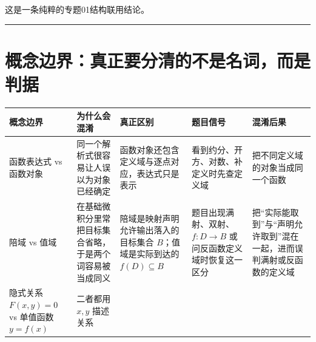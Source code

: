 \documentclass[11pt,a4paper]{ctexart}
\newcounter{none}
\begin{document}
这是一条纯粹的专题01结构联用结论。

\begin{center}\rule{0.5\linewidth}{0.5pt}\end{center}

\section{概念边界：真正要分清的不是名词，而是判据}\label{ux6982ux5ff5ux8fb9ux754cux771fux6b63ux8981ux5206ux6e05ux7684ux4e0dux662fux540dux8bcdux800cux662fux5224ux636e}

{\def\LTcaptype{none} %
\begin{longtable}[]{@{}
  >{\raggedright\arraybackslash}p{}
  >{\centering\arraybackslash}p{}
  >{\raggedright\arraybackslash}p{}
  >{\raggedright\arraybackslash}p{}
  >{\raggedright\arraybackslash}p{}@{}}
\toprule\noalign{}
\begin{minipage}[b]{\linewidth}\raggedright
概念边界
\end{minipage} & \begin{minipage}[b]{\linewidth}\raggedright
为什么会混淆
\end{minipage} & \begin{minipage}[b]{\linewidth}\raggedright
真正区别
\end{minipage} & \begin{minipage}[b]{\linewidth}\raggedright
题目信号
\end{minipage} & \begin{minipage}[b]{\linewidth}\raggedright
混淆后果
\end{minipage} \\
\midrule\noalign{}
\endhead
\bottomrule\noalign{}
\endlastfoot
函数表达式 vs 函数对象 & 同一个解析式很容易让人误以为对象已经确定 &
函数对象还包含定义域与逐点对应，表达式只是表示 & 看到约分、开方、对数、补定义时先查定义域 &
把不同定义域的对象当成同一个函数 \\
陪域 vs 值域 & 在基础微积分里常把目标集合省略，于是两个词容易被当成同义 &
陪域是映射声明允许输出落入的目标集合 \(B\)；值域是实际到达的 \(f(D)\subseteq B\) & 题目出现满射、双射、\(f:D\to B\) 或问反函数定义域时恢复这一区分 &
把“实际能取到”与“声明允许取到”混在一起，进而误判满射或反函数的定义域 \\
隐式关系 \(F(x,y)=0\) vs 单值函数 \(y=f(x)\) & 二者都用 \(x,y\) 描述关系 &

\end{longtable}}
\end{document}
